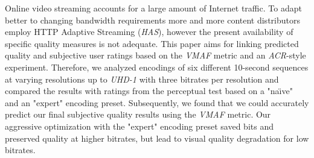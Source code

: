 Online video streaming accounts for a large amount of Internet traffic. To adapt better to changing bandwidth requirements more and more content distributors employ HTTP Adaptive Streaming (\textit{HAS}), however the present availability of specific quality measures is not adequate. This paper aims for linking predicted quality and subjective user ratings based on the \textit{VMAF} metric and an \textit{ACR}-style experiment. Therefore, we analyzed encodings of six different 10-second sequences at varying resolutions up to \textit{UHD-1} with three bitrates per resolution and compared the results with ratings from the perceptual test based on a "na\"{\i}ve" and an "expert" encoding preset. Subsequently, we found that we could accurately predict our final subjective quality results using the \textit{VMAF} metric. Our aggressive optimization with the "expert" encoding preset saved bits and preserved quality at higher bitrates, but lead to visual quality degradation for low bitrates.